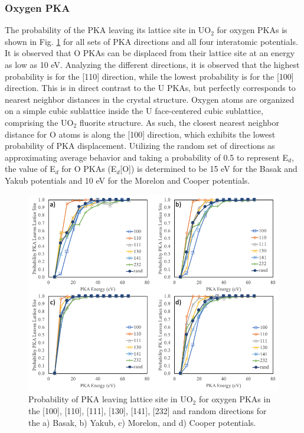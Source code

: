 \documentclass[review]{elsarticle}
\begin{document}
\FloatBarrier

\subsubsection{Oxygen PKA}

The probability of the PKA leaving its lattice site in UO$_2$ for oxygen PKAs is shown in Fig. \ref{fig:pkao} for all sets of PKA directions and all four interatomic potentials. It is observed that O PKAs can be displaced from their lattice site at an energy as low as 10 eV. Analyzing the different directions, it is observed that the highest probability is for the [110] direction, while the lowest probability is for the [100] direction. This is in direct contrast to the U PKAs, but perfectly corresponds to nearest neighbor distances in the crystal structure. Oxygen atoms are organized on a simple cubic sublattice inside the U face-centered cubic sublattice, comprising the UO$_2$ fluorite structure. As such, the closest nearest neighbor distance for O atoms is along the [100] direction, which exhibits the lowest probability of PKA displacement. Utilizing the random set of directions as approximating average behavior and taking a probability of 0.5 to represent E$_d$, the value of E$_d$ for O PKAs (E$_d$[O]) is determined to be 15 eV for the Basak and Yakub potentials and 10 eV for the Morelon and Cooper potentials.

\begin{figure}[h]
 \centering
 \includegraphics[width=1.0\textwidth]{pka_Opka.png}
 \caption{Probability of PKA leaving lattice site in UO$_2$ for oxygen PKAs in the [100], [110], [111], [130], [141], [232] and random directions for the a) Basak, b) Yakub, c) Morelon, and d) Cooper potentials.}
 \label{fig:pkao}
\end{figure}
\end{document}
